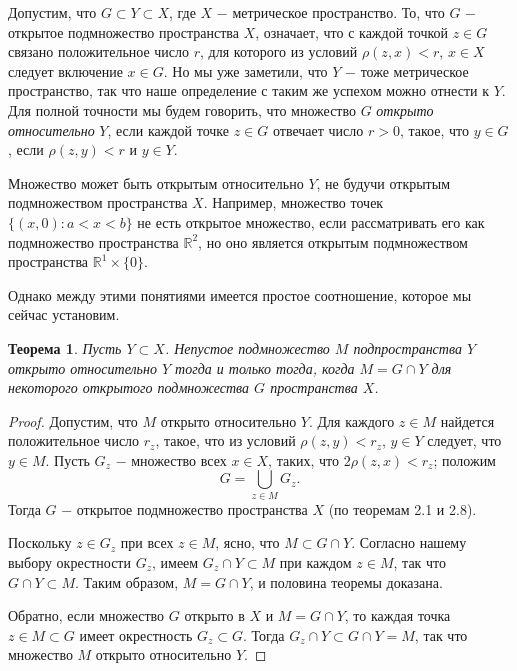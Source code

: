 \documentclass{article}
\newtheorem{theorem}{Теорема}[section]
\begin{document}
Допустим, что \(G \subset Y \subset X\), где \(X\) \(-\) метрическое пространство. То, что \(G\) \(-\) открытое подмножество пространства \(X\), означает, что с каждой точкой \(z \in G\) связано положительное число \(r\), для которого из условий \(\rho(z, x) < r\), \(x \in X\) следует включение \(x \in G\). Но мы уже заметили, что \(Y\) \(-\) тоже метрическое пространство, так что наше определение с таким же успехом можно отнести к \(Y\). Для полной точности мы будем говорить, что множество \(G\) \textit{открыто относительно} \(Y\), если каждой точке \(z \in G\) отвечает число \(r > 0\), такое, что \(y \in G\), если \(\rho(z, y) < r\) и \(y \in Y\).

Множество может быть открытым относительно \(Y\), не будучи открытым подмножеством пространства \(X\). Например, множество точек \(\{(x, 0) : a < x < b\}\) не есть открытое множество, если рассматривать его как подмножество пространства \(\mathbb{R}^2\), но оно является открытым подмножеством пространства \(\mathbb{R}^1 \times \{0\}\).

Однако между этими понятиями имеется простое соотношение, которое мы сейчас установим.

\begin{theorem}
Пусть \(Y \subset X\). Непустое подмножество \(M\) подпространства \(Y\) открыто относительно \(Y\) тогда и только тогда, когда \(M = G \cap Y\) для некоторого открытого подмножества \(G\) пространства \(X\).
\end{theorem}

\begin{proof}
Допустим, что \(M\) открыто относительно \(Y\). Для каждого \(z \in M\) найдется положительное число \(r_z\), такое, что из условий \(\rho(z, y) < r_z\), \(y \in Y\) следует, что \(y \in M\). Пусть \(G_z\) \(-\) множество всех \(x \in X\), таких, что \(2\rho(z, x) < r_z\); положим
\[
G = \bigcup\limits_{z \in M} G_z.
\]
Тогда \(G\) \(-\) открытое подмножество пространства \(X\) (по теоремам 2.1 и 2.8).

Поскольку \(z \in G_z\) при всех \(z \in M\), ясно, что \(M \subset G \cap Y\). Согласно нашему выбору окрестности \(G_z\), имеем \(G_z \cap Y \subset M\) при каждом \(z \in M\), так что \(G \cap Y \subset M\). Таким образом, \(M = G \cap Y\), и половина теоремы доказана.

Обратно, если множество \(G\) открыто в \(X\) и \(M = G \cap Y\), то каждая точка \(z \in M \subset G\) имеет окрестность \(G_z \subset G\). Тогда \(G_z \cap Y \subset G \cap Y = M\), так что множество \(M\) открыто относительно \(Y\).
\end{proof}
\end{document}
